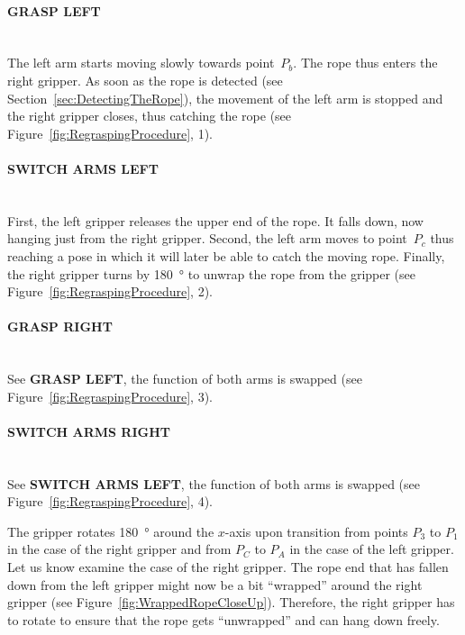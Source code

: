         \paragraph{GRASP LEFT}~\\
            The left arm starts moving slowly towards point~$P_b$. The rope thus enters the right gripper. As soon as the rope is detected (see Section~\ref{sec:DetectingTheRope}), the movement of the left arm is stopped and the right gripper closes, thus catching the rope (see Figure~\ref{fig:RegraspingProcedure}, 1).

        \paragraph{SWITCH ARMS LEFT}~\\
            First, the left gripper releases the upper end of the rope. It falls down, now hanging just from the right gripper. Second, the left arm moves to point~$P_c$ thus reaching a pose in which it will later be able to catch the moving rope. Finally, the right gripper turns by \SI{180}{\degree} to unwrap the rope from the gripper (see Figure~\ref{fig:RegraspingProcedure}, 2).

        \paragraph{GRASP RIGHT}~\\
            See \textbf{GRASP LEFT}, the function of both arms is swapped (see Figure~\ref{fig:RegraspingProcedure}, 3).

        \paragraph{SWITCH ARMS RIGHT}~\\
            See \textbf{SWITCH ARMS LEFT}, the function of both arms is swapped (see Figure~\ref{fig:RegraspingProcedure}, 4).

        The gripper rotates \SI{180}{\degree} around the $x$-axis upon transition from points $P_3$ to $P_1$ in the case of the right gripper and from $P_C$ to $P_A$ in the case of the left gripper. Let us know examine the case of the right gripper. The rope end that has fallen down from the left gripper might now be a bit ``wrapped'' around the right gripper (see Figure~\ref{fig:WrappedRopeCloseUp}). Therefore, the right gripper has to rotate to ensure that the rope gets ``unwrapped'' and can hang down freely.

